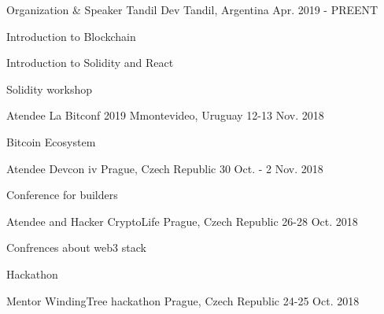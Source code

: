 \begin{cventries}
\cventry
{Organization \& Speaker} %
{Tandil Dev} %
{Tandil, Argentina} %
{Apr. 2019 - PREENT} %
{ %
\begin{cvitems}
\item {Introduction to Blockchain}
\item {Introduction to Solidity and React}
\item {Solidity workshop}
\end{cvitems}
}
\cventry
{Atendee} %
{La Bitconf 2019} %
{Mmontevideo, Uruguay} %
{12-13 Nov. 2018} %
{ %
\begin{cvitems}
\item {Bitcoin Ecosystem}
\end{cvitems}
}
\cventry
{Atendee} %
{Devcon iv} %
{Prague, Czech Republic} %
{30 Oct. - 2 Nov. 2018} %
{ %
\begin{cvitems}
\item {Conference for builders}
\end{cvitems}
}
\cventry
{Atendee and Hacker} %
{CryptoLife} %
{Prague, Czech Republic} %
{26-28 Oct. 2018} %
{ %
\begin{cvitems}
\item {Confrences about web3 stack}
\item {Hackathon}
\end{cvitems}
}
\cventry
{Mentor} %
{WindingTree hackathon} %
{Prague, Czech Republic} %
{24-25 Oct. 2018} %
{ %
}
\end{cventries}
